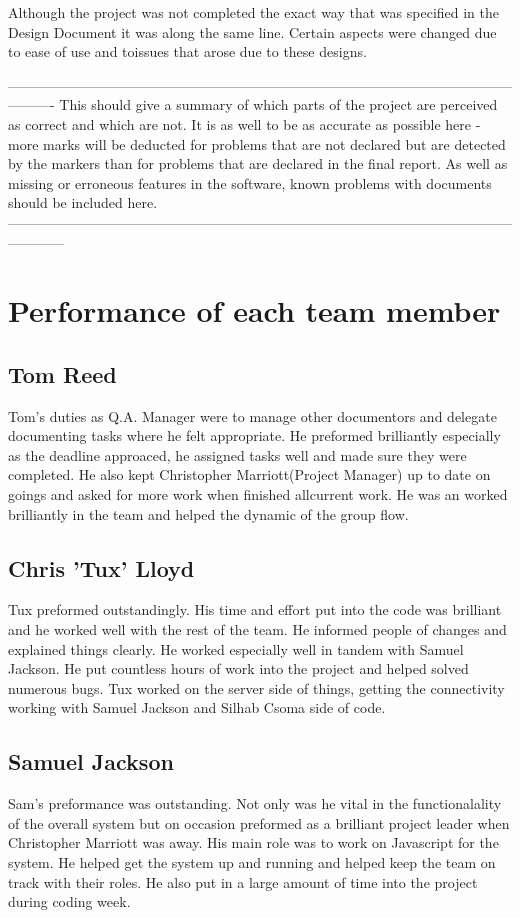 \documentclass{project}
\begin{document}
Although the project was not completed the exact way that was specified in the Design Document it was along the same line. Certain aspects were changed due to ease of use and toissues that arose due to these designs. 

----------------------------------------------------------------------------------------------------------------------
This should give a summary of which parts of the project are perceived as correct and
which are not. It is as well to be as accurate as possible here - more marks will be deducted for problems that are
not declared but are detected by the markers than for problems that are declared in the final report. As well as
missing or erroneous features in the software, known problems with documents should be included here.
------------------------------------------------------------------------------------------------------------------------

\section{Performance of each team member}
\subsection{Tom Reed}
Tom's duties as Q.A. Manager were to manage other documentors and delegate documenting tasks where he felt appropriate. He preformed brilliantly especially as the deadline approaced, he assigned tasks well and made sure they were completed. He also kept Christopher Marriott(Project Manager) up to date on goings and asked for more work when finished allcurrent work. He was an worked brilliantly in the team and helped the dynamic of the group flow.  

\subsection{Chris 'Tux' Lloyd}
Tux preformed outstandingly. His time and effort put into the code was brilliant and he worked well with the rest of the team. He informed people of changes and explained things clearly. He worked especially well in tandem with Samuel Jackson. He put countless hours of work into the project and helped solved numerous bugs. Tux worked on the server side of things, getting the connectivity working with Samuel Jackson and Silhab Csoma side of code.

\subsection{Samuel Jackson}
Sam's preformance was outstanding. Not only was he vital in the functionalality of the overall system but on occasion preformed as a brilliant project leader when Christopher Marriott was away. His main role was to work on Javascript for the system. He helped get the system up and running and helped keep the team on track with their roles. He also put in a large amount of time into the project during coding week.
\end{document}

